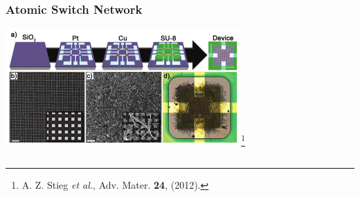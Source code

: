 \documentclass[mathserif]{beamer}
\begin{document}
\begin{frame}
\begin{columns}
\begin{center}
\end{center}
\end{columns}
\end{frame}

\begin{frame}
\frametitle{Atomic Switch Network}

\begin{center}
\includegraphics[width=9cm]{ASN_fabrication.png}\footnote{A. Z. Stieg \emph{et al.}, Adv. Mater. \textbf{24}, (2012).}
\end{center}

\begin{columns}
\centering
{}
\centering
{}
\end{columns}

\end{frame}
\end{document}
